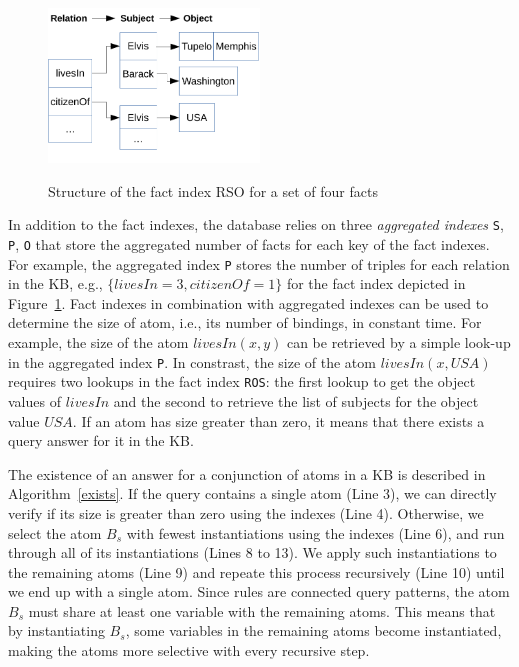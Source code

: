 \begin{figure}
\includegraphics[width=0.5\textwidth]{figures/indexes}\
\caption{Structure of the fact index RSO for a set of four facts}
\label{indexes}
\end{figure}

In addition to the fact indexes, the database relies 
on three \emph{aggregated indexes} \texttt{S}, \texttt{P}, \texttt{O} that store the aggregated number of facts for each
key of the fact indexes. For example, the aggregated index \texttt{P} stores the number of triples for each relation
in the KB, e.g., $\{ livesIn=3, citizenOf=1 \}$ for the fact index depicted in Figure~\ref{indexes}. 
Fact indexes in combination with aggregated indexes can be used to determine the size of atom, i.e., its number of bindings, 
in constant time. For example, the size of the atom $livesIn(x,y)$ can be retrieved by a simple look-up 
in the aggregated index \texttt{P}. In constrast, the size of the atom $livesIn(x, USA)$ requires two 
lookups in the fact index \texttt{ROS}: the first lookup to get the object values of $livesIn$ and the second
to retrieve the list of subjects for the object value $USA$. If an atom has size greater than zero, it means
that there exists a query answer for it in the KB.

The existence of an answer for a conjunction of atoms in a KB is described in Algorithm~\ref{exists}. 
If the query contains a single atom (Line 3), we can directly verify if its size is greater than zero using
the indexes (Line 4). Otherwise, we select the atom $B_s$ with fewest instantiations using the indexes (Line 6), 
and run through all of its instantiations (Lines 8 to 13). We apply such instantiations to the remaining atoms (Line 9)
and repeate this process recursively (Line 10) until we end up with a single atom. Since rules are connected query patterns, the atom $B_s$ must share at least
one variable with the remaining atoms. This means that by instantiating $B_s$, some variables in the remaining atoms 
become instantiated, making the atoms more selective with every recursive step.

